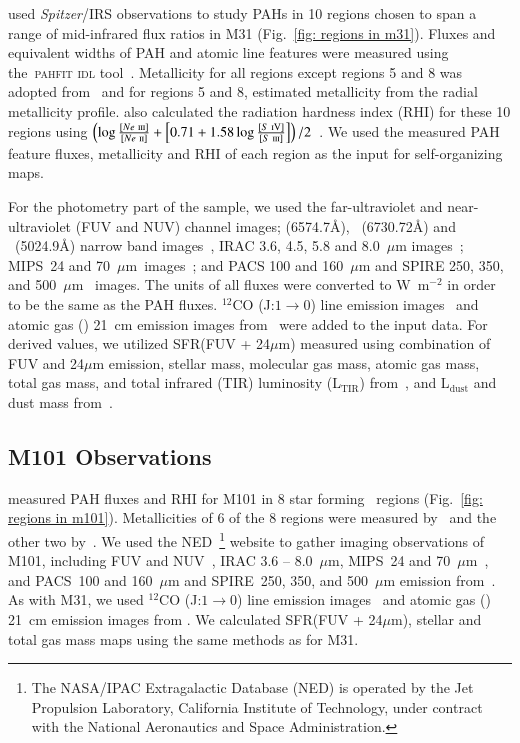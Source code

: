      \cite{Dim15} used {\it Spitzer}/IRS observations to study PAHs in 10 regions chosen to span a range of mid-infrared flux ratios in M31 (Fig.~\ref{fig: regions in m31}). 
     Fluxes and equivalent widths of PAH and atomic line features were measured using the~\textsc{pahfit idl} tool~\citep{Smith07b}.
     Metallicity for all regions except regions 5 and 8 was adopted from~\citep{Sanders12} and for regions 5 and 8, \cite{Dim15} estimated metallicity from the radial metallicity profile.
     \cite{Dim15} also calculated the radiation hardness index (RHI) for these 10 regions using $\left (\log \frac{[Ne~\textsc{iii}]}{[Ne~\textsc{ii}]} + \left [ 0.71 + 1.58\log\frac{[S~\textsc{iV}]}{[S~\textsc{iii}]} \right ] \right )/2$~\citep{Engelbracht08}. 
     We used the measured PAH feature fluxes, metallicity and RHI of each region as the input for self-organizing maps.
     
    For the photometry part of the sample, we used the \GALEX \citep{Martin05} far-ultraviolet and near-ultraviolet (FUV and NUV) channel images; \halpha (6574.7\AA), \sii~(6730.72\AA) and \oiii~(5024.9\AA) narrow band images~\citep{Massey07}, IRAC 3.6, 4.5, 5.8 and 8.0~$\mu$m images~\citep{Barmby06}; MIPS~24 and 70~$\mu$m~images~\citep{Gordon06}; and PACS 100 and 160~$\mu$m and SPIRE 250, 350, and 500~$\mu$m~\citep{Fritz12} images.
     The units of all fluxes were converted to W~m$^{-2}$ in order to be the same as the PAH fluxes.
     $^{12}$CO (J:$1\rightarrow0$) line emission images~\citep{Nieten06} and atomic gas (\hi) 21~cm emission images from~\cite{Chemin09} were added to the input data. 
     For derived values, we utilized SFR(FUV + 24$\mu$m) measured using combination of FUV and 24$\mu$m emission, stellar mass, molecular gas mass, atomic gas mass, total gas mass, and total infrared (TIR) luminosity (L$_\mathrm{TIR}$) from~\cite{Rahmani16}, and L$_\mathrm{dust}$ and dust mass from~\cite{Draine14}.
     
    \subsection{M101 Observations}
    \label{Sec: data_M101_SOMN} 
    
     \cite{Gordon08} measured PAH fluxes and RHI for M101 in 8 star forming \hii~regions (Fig.~\ref{fig: regions in m101}).
     Metallicities of 6 of the 8 regions were measured by~\cite{Kennicutt03} and the other two by~\cite{Gordon08}.
     We used the NED~\footnote{The NASA/IPAC Extragalactic Database (NED) is operated by the Jet Propulsion Laboratory, California Institute of Technology, under contract with the National Aeronautics and Space Administration.} website to gather imaging observations of M101, including 
      \GALEX FUV and NUV~\citep{depaz07}, IRAC 3.6 -- 8.0~$\mu$m, MIPS~24 and 70~$\mu$m~\citep{Dale09}, and PACS~100 and 160~$\mu$m and SPIRE~250, 350, and 500~$\mu$m emission from~\cite{Kennicutt11}.
     As with M31, we used $^{12}$CO (J:$1\rightarrow0$) line emission images~\citep{Helfer03} and atomic gas (\hi) 21~cm emission images from \cite{Walter08}.
     We calculated SFR(FUV + 24$\mu$m), stellar and total gas mass maps using the same methods as for M31.
     
